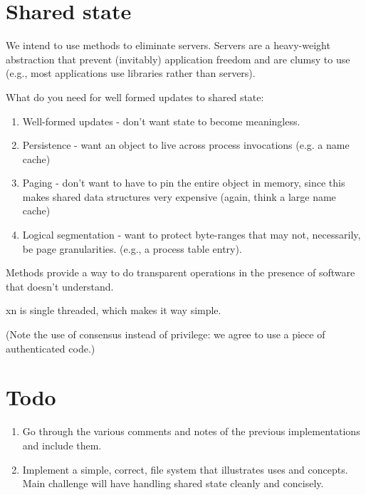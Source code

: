 \section{Shared state}

We intend to use methods to eliminate servers.  Servers are a
heavy-weight abstraction that prevent (invitably) application
freedom and are clumsy to use (e.g., most applications use
libraries rather than servers).

What do you need for well formed updates to shared state:

\begin{enumerate}
	\item Well-formed updates - don't want state to become
	meaningless.

	\item Persistence - want an object to live across process
	invocations (e.g. a name cache)

	\item Paging - don't want to have to pin the entire object in
	memory, since this makes shared data structures very expensive
	(again, think a large name cache)

	\item Logical segmentation - want to protect byte-ranges that
	may not, necessarily, be page granularities.  (e.g., a process
	table entry).

\end{enumerate}
Methods provide a way to do transparent operations in the presence
of software that doesn't understand.

xn is single threaded, which makes it way simple.

(Note the use of consensus instead of privilege: we agree to 
use a piece of authenticated code.)

\section{Todo}
\begin{enumerate}
	\item Go through the various comments and notes of the previous
	implementations and include them.

	\item Implement a simple, correct, file system that illustrates
	uses and concepts.  Main challenge will have handling shared state
	cleanly and concisely.
\end{enumerate}

